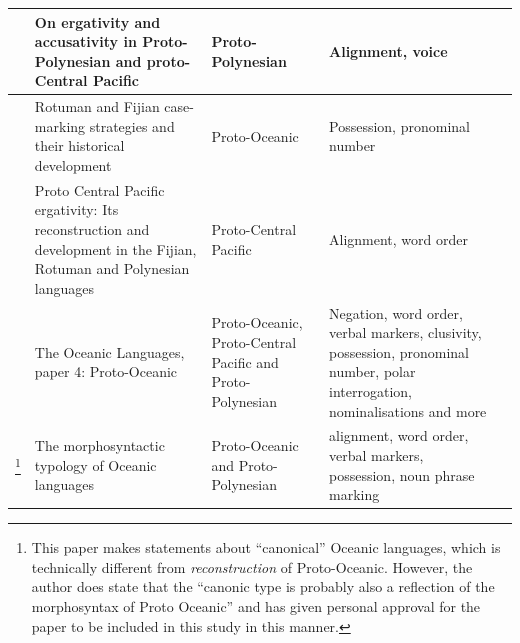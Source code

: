 \documentclass[12pt,letterpaper]{article}
\begin{document}
\begin{longtable}{|p{3cm}|  p{5cm}| p{4cm} | p{3cm}  | p{3cm} |}
\citet{ball2007ergativity} & On ergativity and accusativity in Proto-Polynesian and proto-Central Pacific&Proto-Polynesian & Alignment, voice \\ \hline

\citet{kikusawa2001rotuman} & Rotuman and Fijian case-marking strategies and their historical development  & Proto-Oceanic & Possession, pronominal number \\ \hline

\citet{kikusawa2002proto}  & Proto Central Pacific ergativity: Its reconstruction and development in the Fijian, Rotuman and Polynesian languages & Proto-Central Pacific   & Alignment, word order \\ \hline

\citet{lynchrosscrowley_proto_grammar_oceanic} & The Oceanic Languages, paper 4: Proto-Oceanic & Proto-Oceanic, Proto-Central Pacific and Proto-Polynesian & Negation, word order, verbal markers, clusivity, possession, pronominal number, polar interrogation, nominalisations and more \\ \hline

\citet{ross2004morphosyntactic}\footnote{This paper makes statements about ``canonical'' Oceanic languages, which is technically different from \emph{reconstruction} of Proto-Oceanic. However, the author does state that the ``canonic type is probably also a reflection of the morphosyntax of Proto Oceanic'' \citep[492]{ross2004morphosyntactic} and has given personal approval for the paper to be included in this study in this manner.}  & The morphosyntactic typology of Oceanic languages &  Proto-Oceanic and Proto-Polynesian  & alignment, word order, verbal markers, possession, noun phrase marking \\ \hline
\end{longtable}

\FloatBarrier
%

\end{document}
